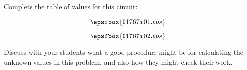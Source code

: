 

Complete the table of values for this circuit:

$$\epsfbox{01767x01.eps}$$







$$\epsfbox{01767x02.eps}$$







Discuss with your students what a good procedure might be for calculating the unknown values in this problem, and also how they might check their work.




